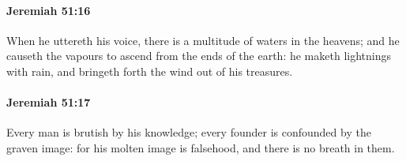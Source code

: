 		\paragraph{Jeremiah 51:16} %
			\label{JEREMIAH-51-16}

			When he uttereth his voice, there is a multitude of waters in the heavens; and he causeth the vapours to ascend from the ends of the earth: he maketh lightnings with rain, and bringeth forth the wind out of his treasures.


		\paragraph{Jeremiah 51:17} %
			\label{JEREMIAH-51-17}

			Every man is brutish by his knowledge; every founder is confounded by the graven image: for his molten image is falsehood, and there is no breath in them.

